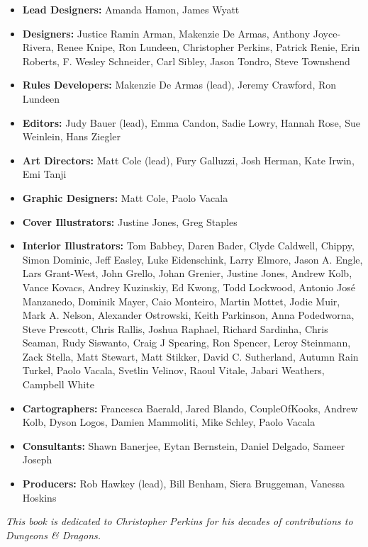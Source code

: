 \documentclass[letterpaper, 11pt, twocolumn]{dndbook}
\begin{document}
\begin{itemize}
\item \textbf{Lead Designers:} Amanda Hamon, James Wyatt
\item \textbf{Designers:} Justice Ramin Arman, Makenzie De Armas, Anthony Joyce-Rivera, Renee Knipe, Ron Lundeen, Christopher Perkins, Patrick Renie, Erin Roberts, F. Wesley Schneider, Carl Sibley, Jason Tondro, Steve Townshend
\item \textbf{Rules Developers:} Makenzie De Armas (lead), Jeremy Crawford, Ron Lundeen
\item \textbf{Editors:} Judy Bauer (lead), Emma Candon, Sadie Lowry, Hannah Rose, Sue Weinlein, Hans Ziegler
\item \textbf{Art Directors:} Matt Cole (lead), Fury Galluzzi, Josh Herman, Kate Irwin, Emi Tanji
\item \textbf{Graphic Designers:} Matt Cole, Paolo Vacala
\item \textbf{Cover Illustrators:} Justine Jones, Greg Staples
\item \textbf{Interior Illustrators:} Tom Babbey, Daren Bader, Clyde Caldwell, Chippy, Simon Dominic, Jeff Easley, Luke Eidenschink, Larry Elmore, Jason A. Engle, Lars Grant-West, John Grello, Johan Grenier, Justine Jones, Andrew Kolb, Vance Kovacs, Andrey Kuzinskiy, Ed Kwong, Todd Lockwood, Antonio José Manzanedo, Dominik Mayer, Caio Monteiro, Martin Mottet, Jodie Muir, Mark A. Nelson, Alexander Ostrowski, Keith Parkinson, Anna Podedworna, Steve Prescott, Chris Rallis, Joshua Raphael, Richard Sardinha, Chris Seaman, Rudy Siswanto, Craig J Spearing, Ron Spencer, Leroy Steinmann, Zack Stella, Matt Stewart, Matt Stikker, David C. Sutherland, Autumn Rain Turkel, Paolo Vacala, Svetlin Velinov, Raoul Vitale, Jabari Weathers, Campbell White
\item \textbf{Cartographers:} Francesca Baerald, Jared Blando, CoupleOfKooks, Andrew Kolb, Dyson Logos, Damien Mammoliti, Mike Schley, Paolo Vacala
\item \textbf{Consultants:} Shawn Banerjee, Eytan Bernstein, Daniel Delgado, Sameer Joseph
\item \textbf{Producers:} Rob Hawkey (lead), Bill Benham, Siera Bruggeman, Vanessa Hoskins
\end{itemize}
\textit{This book is dedicated to Christopher Perkins for his decades of contributions to Dungeons \& Dragons.}
\end{document}
